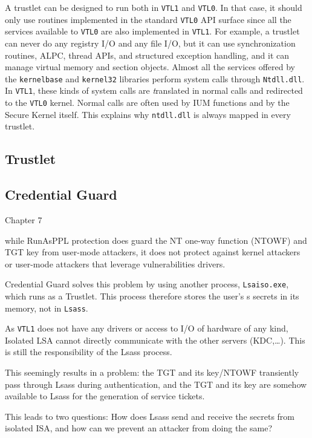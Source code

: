 A trustlet can be designed to run both in \verb+VTL1+ and \verb+VTL0+. In that case, it should only use routines implemented in the standard \verb+VTL0+ API surface since all the services available to \verb+VTL0+ are also implemented in \verb+VTL1+. For example, a trustlet can never do any registry I/O and any file I/O, but it can use synchronization routines, ALPC, thread APIs, and structured exception handling, and it can manage virtual memory and section objects. Almost all the services offered by the \verb+kernelbase+ and \verb+kernel32+ libraries perform system calls through \verb+Ntdll.dll+. In \verb+VTL1+, these kinds of system calls are {\emph translated} in normal calls and redirected to the \verb+VTL0+ kernel. Normal calls are often used by IUM functions and by the Secure Kernel itself. This explains why \verb+ntdll.dll+ is always mapped in every trustlet.



\subsection{Trustlet}




\subsection{Credential Guard}

Chapter 7

while RunAsPPL protection does guard the NT one-way function (NTOWF) and  TGT key from user-mode attackers, it does not protect against kernel attackers or user-mode attackers that
leverage vulnerabilities drivers.

Credential Guard solves this problem by using another process, \verb+Lsaiso.exe+, which runs as a Trustlet. This process therefore stores the user’s s secrets in its memory, not in \verb+Lsass+.

As \verb+VTL1+ does not have any drivers or access to I/O of hardware of any kind, Isolated LSA cannot directly communicate with the other servers (KDC,\ldots). This is still the responsibility of the Lsass process.

This seemingly results in a problem: the TGT and its key/NTOWF transiently pass through Lsass during authentication, and the TGT and its key are somehow available to Lsass for the generation of service tickets.

This leads to two questions: How does Lsass send and receive the secrets from isolated ISA, and how can we prevent an attacker from doing the same?

